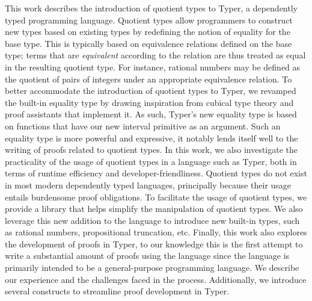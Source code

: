 \documentclass[12pt,twoside,maitrise]{dms}
\theoremstyle{definition}
\numberwithin{equation}{section}
\numberwithin{table}{chapter}
\numberwithin{figure}{chapter}
\begin{document}
This work describes the introduction of quotient types to Typer, a dependently
typed programming language. Quotient types allow programmers to construct new
types based on existing types by redefining the notion of equality for the base
type. This is typically based on equivalence relations defined on the base type;
terms that are \emph{equivalent} according to the relation are thus treated as
equal in the resulting quotient type. For instance, rational numbers may be
defined as the quotient of pairs of integers under an appropriate equivalence
relation. To better accommodate the introduction of quotient types to Typer, we
revamped the built-in equality type by drawing inspiration from cubical type
theory and proof assistants that implement it. As such, Typer's new equality
type is based on functions that have our new interval primitive as an argument.
Such an equality type is more powerful and expressive, it notably lends itself
well to the writing of proofs related to quotient types. In this work, we also
investigate the practicality of the usage of quotient types in a language such
as Typer, both in terms of runtime efficiency and developer-friendliness.
Quotient types do not exist in most modern dependently typed languages,
principally because their usage entails burdensome proof obligations. To
facilitate the usage of quotient types, we provide a library that helps simplify
the manipulation of quotient types. We also leverage this new addition to the
language to introduce new built-in types, such as rational numbers,
propositional truncation, etc. Finally, this work also explores the development
of proofs in Typer, to our knowledge this is the first attempt to write a
substantial amount of proofs using the language since the language is primarily
intended to be a general-purpose programming language. We describe our
experience and the challenges faced in the process. Additionally, we introduce
several constructs to streamline proof development in Typer.



\anglais
\end{document}
